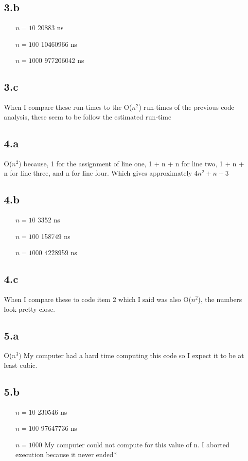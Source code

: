 \documentclass[12pt,letterpaper]{article}
\begin{document}
\subsection*{3.b}
\begin{itemize}
\item[$n=10$] 20883 ns
\item[$n=100$] 10460966 ns
\item[$n=1000$] 977206042 ns
\end{itemize}
\subsection*{3.c}
When I compare these run-times to the O($n^2$) run-times of the previous code analysis, these seem to be follow the estimated run-time
\subsection*{4.a}
O($n^2$) because, 1 for the assignment of line one, 1 + n + n for line two, 1 + n + n for line three, and n for line four. Which gives approximately $4n^2 + n + 3$
\subsection*{4.b}
\begin{itemize}
\item[$n=10$] 3352 ns
\item[$n=100$] 158749 ns
\item[$n=1000$] 4228959 ns
\end{itemize}
\subsection*{4.c}
When I compare these to code item 2 which I said was also O($n^2$), the numbers look pretty close.
\newpage
\subsection*{5.a}
O($n^3$) My computer had a hard time computing this code so I expect it to be at least cubic.
\subsection*{5.b}
\begin{itemize}
\item[$n=10$] 230546 ns
\item[$n=100$] 97647736 ns
\item[$n=1000$] \scriptsize *My computer could not compute for this value of n. I aborted execution because it never ended*\small
\end{itemize}
\end{document}
